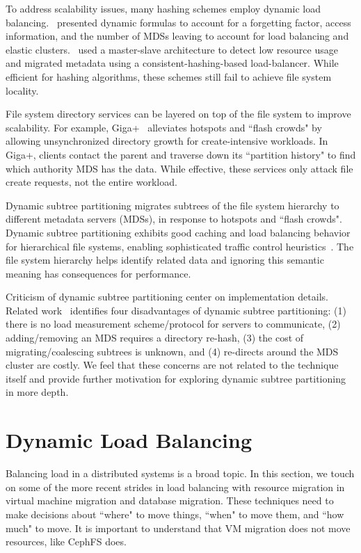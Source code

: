 To address scalability issues, many hashing schemes employ dynamic load balancing.~\cite{li:msst2006-dynamic} presented dynamic formulas to account for a forgetting factor, access information, and the number of MDSs leaving to account for load balancing and elastic clusters.~\cite{xing:sc2009-skyfs} used a master-slave architecture to detect low resource usage and migrated metadata using a consistent-hashing-based load-balancer. While efficient for hashing algorithms, these schemes still fail to achieve file system locality. 

File system directory services can be layered on top of the file system to improve scalability. For example, Giga+~\cite{patil:fast2011-giga+} alleviates hotspots and ``flash crowds" by allowing unsynchronized directory growth for create-intensive workloads. In Giga+, clients contact the parent and traverse down its ``partition history" to find which authority MDS has the data. While effective, these services only attack file create requests, not the entire workload.  

Dynamic subtree partitioning migrates subtrees of the file system hierarchy to different metadata servers (MDSs), in response to hotspots and ``flash crowds".  Dynamic subtree partitioning exhibits good caching and load balancing behavior for hierarchical file systems, enabling sophisticated traffic control heuristics~\cite{weil:sc2004-dyn-metadata}. The file system hierarchy helps identify related data and ignoring this semantic meaning has consequences for performance. 

Criticism of dynamic subtree partitioning center on implementation details. Related work~\cite{zhu:pds2008-hba, li:msst2006-dynamic} identifies four disadvantages of dynamic subtree partitioning: (1) there is no load measurement scheme/protocol for servers to communicate, (2) adding/removing an MDS requires a directory re-hash, (3) the cost of migrating/coalescing subtrees is unknown, and (4) re-directs around the MDS cluster are costly. We feel that these concerns are not related to the technique itself and provide further motivation for exploring dynamic subtree partitioning in more depth. 

\section{Dynamic Load Balancing}
\label{related-work:heuristics}
Balancing load in a distributed systems is a broad topic. In this section, we touch on some of the more recent strides in load balancing with resource migration in virtual machine migration and database migration. These techniques need to make decisions about ``where" to move things, ``when" to move them, and ``how much" to move. It is important to understand that VM migration does not move resources, like CephFS does.

